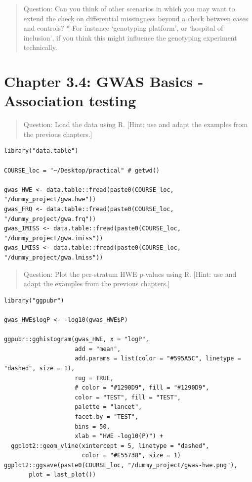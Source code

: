 \documentclass[
]{book}
\begin{document}
\begin{quote}
Question: Can you think of other scenarios in which you may want to extend the check on differential missingness beyond a check between cases and controls?
* For instance `genotyping platform', or `hospital of inclusion', if you think this might influence the genotyping experiment technically.
\end{quote}

\hypertarget{chapter-3.4-gwas-basics---association-testing}{%
\section{Chapter 3.4: GWAS Basics - Association testing}\label{chapter-3.4-gwas-basics---association-testing}}

\begin{quote}
Question: Load the data using R. {[}Hint: use and adapt the examples from the previous chapters.{]}
\end{quote}

\begin{lstlisting}
library("data.table")

COURSE_loc = "~/Desktop/practical" # getwd()

gwas_HWE <- data.table::fread(paste0(COURSE_loc, "/dummy_project/gwa.hwe"))
gwas_FRQ <- data.table::fread(paste0(COURSE_loc, "/dummy_project/gwa.frq"))
gwas_IMISS <- data.table::fread(paste0(COURSE_loc, "/dummy_project/gwa.imiss"))
gwas_LMISS <- data.table::fread(paste0(COURSE_loc, "/dummy_project/gwa.lmiss"))
\end{lstlisting}

\begin{quote}
Question: Plot the per-stratum HWE p-values using R. {[}Hint: use and adapt the examples from the previous chapters.{]}
\end{quote}

\begin{lstlisting}
library("ggpubr")

gwas_HWE$logP <- -log10(gwas_HWE$P)

ggpubr::gghistogram(gwas_HWE, x = "logP",
                    add = "mean",
                    add.params = list(color = "#595A5C", linetype = "dashed", size = 1),
                    rug = TRUE,
                    # color = "#1290D9", fill = "#1290D9",
                    color = "TEST", fill = "TEST",
                    palette = "lancet",
                    facet.by = "TEST",
                    bins = 50,
                    xlab = "HWE -log10(P)") +
  ggplot2::geom_vline(xintercept = 5, linetype = "dashed",
                      color = "#E55738", size = 1)
ggplot2::ggsave(paste0(COURSE_loc, "/dummy_project/gwas-hwe.png"),
       plot = last_plot())
\end{lstlisting}
\end{document}
